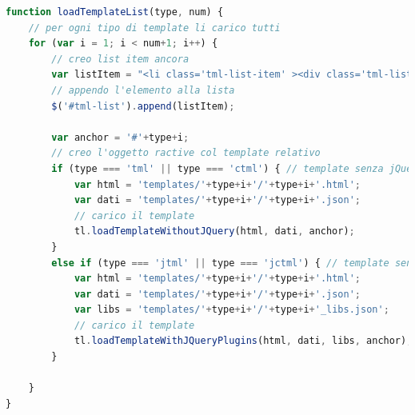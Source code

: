 \begin{lstlisting}[language=JavaScript, caption=Implementazione \texttt{loadTemplateList().}]
function loadTemplateList(type, num) {
	// per ogni tipo di template li carico tutti
	for (var i = 1; i < num+1; i++) {
		// creo list item ancora
		var listItem = "<li class='tml-list-item' ><div class='tml-list-item-div'><a class='tml-list-item-a' onclick='selectTml(this)' href='javascript:void(0)' id='"+type+i+"'></a></div></li>";
		// appendo l'elemento alla lista
		$('#tml-list').append(listItem);

		var anchor = '#'+type+i;
		// creo l'oggetto ractive col template relativo
		if (type === 'tml' || type === 'ctml') { // template senza jQuery
			var html = 'templates/'+type+i+'/'+type+i+'.html';
			var dati = 'templates/'+type+i+'/'+type+i+'.json';
			// carico il template
			tl.loadTemplateWithoutJQuery(html, dati, anchor);
		}
		else if (type === 'jtml' || type === 'jctml') { // template senza jQuery
			var html = 'templates/'+type+i+'/'+type+i+'.html';
			var dati = 'templates/'+type+i+'/'+type+i+'.json';
			var libs = 'templates/'+type+i+'/'+type+i+'_libs.json';
			// carico il template
			tl.loadTemplateWithJQueryPlugins(html, dati, libs, anchor);
		}

	}
}
\end{lstlisting}
